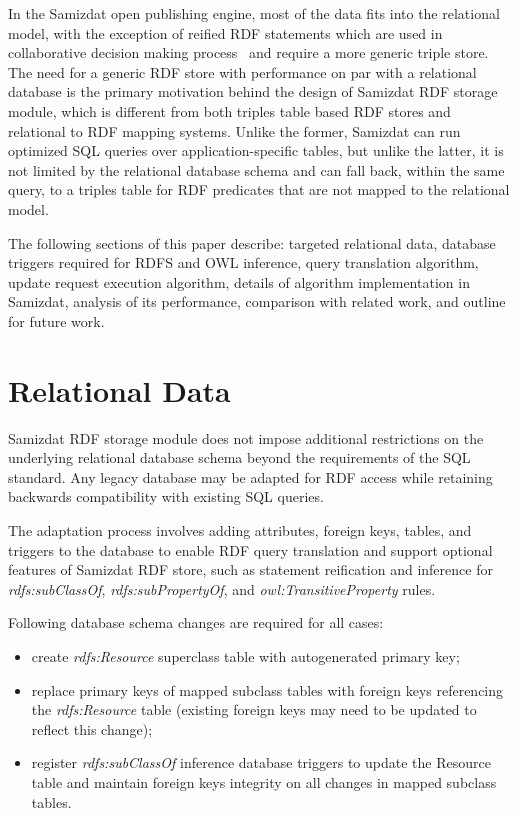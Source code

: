 \documentclass[conference,letterpaper]{IEEEtran}
\begin{document}

In the Samizdat open publishing engine, most of the data fits into the
relational model, with the exception of reified RDF statements which are
used in collaborative decision making process~\cite{samizdat-collreif}
and require a more generic triple store. The need for a generic RDF
store with performance on par with a relational database is the primary
motivation behind the design of Samizdat RDF storage module, which is
different from both triples table based RDF stores and relational to RDF
mapping systems. Unlike the former, Samizdat can run optimized SQL
queries over application-specific tables, but unlike the latter, it is
not limited by the relational database schema and can fall back, within
the same query, to a triples table for RDF predicates that are not
mapped to the relational model.


The following sections of this paper describe: targeted relational data,
database triggers required for RDFS and OWL inference, query translation
algorithm, update request execution algorithm, details of algorithm
implementation in Samizdat, analysis of its performance, comparison with
related work, and outline for future work.


\section{Relational Data}
\label{relational-data}


Samizdat RDF storage module does not impose additional restrictions on
the underlying relational database schema beyond the requirements of the
SQL standard. Any legacy database may be adapted for RDF access while
retaining backwards compatibility with existing SQL queries.

The adaptation process involves adding attributes, foreign keys, tables,
and triggers to the database to enable RDF query translation and support
optional features of Samizdat RDF store, such as statement reification
and inference for {\em rdfs:sub\-Class\-Of}, {\em
rdfs:sub\-Property\-Of}, and {\em owl:Transitive\-Property\/} rules.

Following database schema changes are required for all cases:

\begin{itemize}

\item create {\em rdfs:Resource\/} superclass table with autogenerated
primary key;

\item replace primary keys of mapped subclass tables with foreign keys
referencing the {\em rdfs:Resource\/} table (existing foreign keys may
need to be updated to reflect this change);

\item register {\em rdfs:subClassOf\/} inference database triggers to
update the Resource table and maintain foreign keys integrity on all
changes in mapped subclass tables.

\end{itemize}
\end{document}
